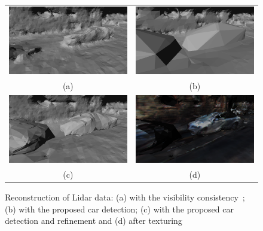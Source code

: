 \begin{figure}[tp]
 \centering
    \begin{tabular}{cc}
    \includegraphics[width=0.4\columnwidth]{./img/ch-laser/base00_}&
    \includegraphics[width=0.4\columnwidth]{./img/ch-laser/car00_}\\
    (a)&
    (b)\\
    \includegraphics[width=0.4\columnwidth]{./img/ch-laser/nottext00_}&
    \includegraphics[width=0.4\columnwidth]{./img/ch-laser/text00_}\\
    (c)&
    (d)
 \end{tabular}
 \caption{Reconstruction of Lidar data: (a) with the visibility consistency~\cite{romanoni15b}; (b) with the proposed car detection; (c) with the proposed car detection and refinement and (d) after texturing}
 \label{fig:cardetection2}
\end{figure}






